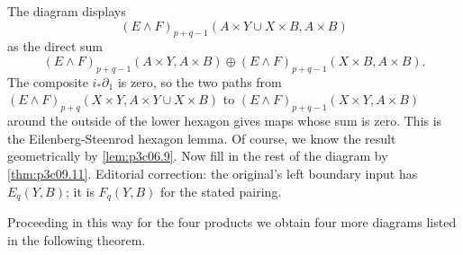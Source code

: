\documentclass[../main]{subfiles}
\begin{document}
The diagram displays \[(E \wedge F)_{p + q - 1} (A \times Y \cup X \times B, A \times B)\] as the direct sum \[(E \wedge F)_{p + q - 1} (A \times Y, A \times B) \oplus (E \wedge F)_{p + q - 1} (X \times B, A \times B).\] The composite $i_\ast \partial_1$ is zero, so the two paths from $(E \wedge F)_{p + q}(X \times Y, A \times Y \cup X \times B)$ to $(E\wedge F)_{p+q-1}(X\times Y, A\times B)$ around the outside of the lower hexagon gives maps whose sum is zero. This is the Eilenberg-Steenrod hexagon lemma. Of course, we know the result geometrically by \ref{lem:p3c06.9}. Now fill in the rest of the diagram by \ref{thm:p3c09.11}. 
\noindent Editorial correction: the original's left boundary input has $E_q(Y,B)$; it is $F_q(Y,B)$ for the stated pairing.

Proceeding in this way for the four products we obtain four more diagrams listed in the following theorem.
\end{document}

